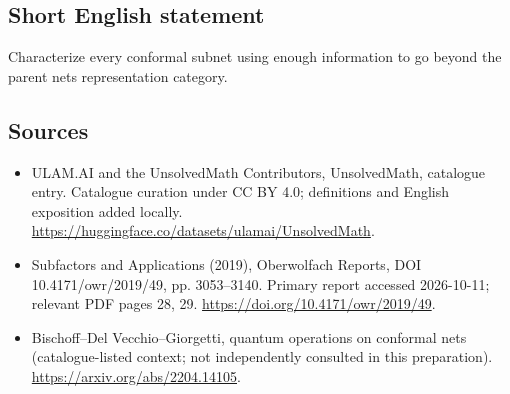 \documentclass[11pt]{article}
\begin{document}
\subsection{Short English statement}
Characterize every conformal subnet using enough information to go beyond the parent net\textquotesingle s representation category.
\subsection{Sources}
\begin{itemize}
\item[\hypertarget{source:statement:1}{S1}] ULAM.AI and the UnsolvedMath Contributors, UnsolvedMath, catalogue entry. Catalogue curation under CC BY 4.0; definitions and English exposition added locally.
\url{https://huggingface.co/datasets/ulamai/UnsolvedMath}.
\item[\hypertarget{source:statement:2}{S2}] Subfactors and Applications (2019), Oberwolfach Reports, DOI 10.4171/owr/2019/49, pp. 3053--3140. Primary report accessed 2026-10-11; relevant PDF pages 28, 29.
\url{https://doi.org/10.4171/owr/2019/49}.
\item[\hypertarget{source:statement:3}{S3}] Bischoff--Del Vecchio--Giorgetti, quantum operations on conformal nets (catalogue-listed context; not independently consulted in this preparation).
\url{https://arxiv.org/abs/2204.14105}.
\end{itemize}
\label{end:statement}
\end{document}
